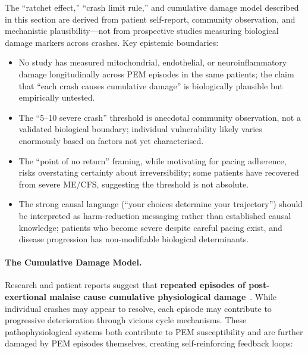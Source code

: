 \begin{limitation}
The ``ratchet effect,'' ``crash limit rule,'' and cumulative damage model described in this section are derived from patient self-report, community observation, and mechanistic plausibility---not from prospective studies measuring biological damage markers across crashes. Key epistemic boundaries:
\begin{itemize}
    \item No study has measured mitochondrial, endothelial, or neuroinflammatory damage longitudinally across PEM episodes in the same patients; the claim that ``each crash causes cumulative damage'' is biologically plausible but empirically untested.
    \item The ``5--10 severe crash'' threshold is anecdotal community observation, not a validated biological boundary; individual vulnerability likely varies enormously based on factors not yet characterised.
    \item The ``point of no return'' framing, while motivating for pacing adherence, risks overstating certainty about irreversibility; some patients have recovered from severe ME/CFS, suggesting the threshold is not absolute.
    \item The strong causal language (``your choices determine your trajectory'') should be interpreted as harm-reduction messaging rather than established causal knowledge; patients who become severe despite careful pacing exist, and disease progression has non-modifiable biological determinants.
\end{itemize}
\end{limitation}

\paragraph{The Cumulative Damage Model.}

Research and patient reports suggest that \textbf{repeated episodes of post-exertional malaise cause cumulative physiological damage}~\cite{Chu2019,Maksoud2020natural}. While individual crashes may appear to resolve, each episode may contribute to progressive deterioration through vicious cycle mechanisms. These pathophysiological systems both contribute to PEM susceptibility and are further damaged by PEM episodes themselves, creating self-reinforcing feedback loops:

